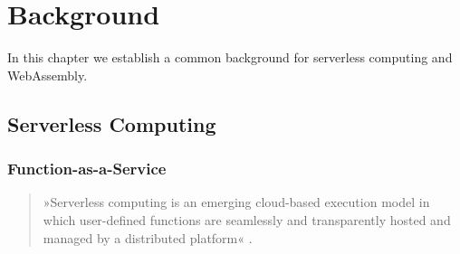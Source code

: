 \chapter{Background}
\label{chapter:background}

In this chapter we establish a common background for serverless computing and WebAssembly.

\section{Serverless Computing}

\subsection{Function-as-a-Service}

\begin{quote}
    »Serverless computing is an emerging cloud-based execution model in which user-defined functions are seamlessly and transparently hosted and managed by a distributed platform« \cite{Nastic2017}.
\end{quote}


